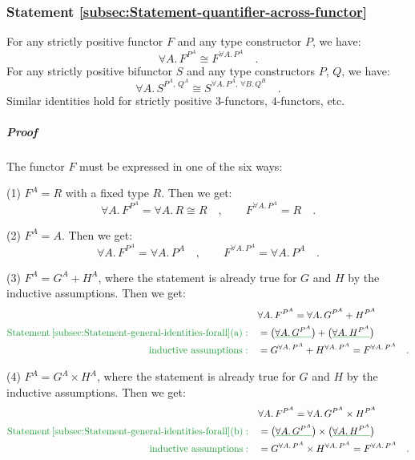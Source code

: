 \subsubsection{Statement \label{subsec:Statement-quantifier-across-functor}\ref{subsec:Statement-quantifier-across-functor}}

For any strictly positive functor $F$ and any type constructor $P$,
we have:
\[
\forall A.\,F^{P^{A}}\cong F^{\forall A.\,P^{A}}\quad.
\]
For any strictly positive bifunctor $S$ and any type constructors
$P$, $Q$, we have:
\[
\forall A.\,S^{P^{A},\,Q^{A}}\cong S^{\forall A.\,P^{A},\,\forall B.\,Q^{B}}\quad.
\]
Similar identities hold for strictly positive $3$-functors, $4$-functors,
etc.

\subparagraph{Proof}

The functor $F$ must be expressed in one of the six ways:

(1) $F^{A}=R$ with a fixed type $R$. Then we get:
\[
\forall A.\,F^{P^{A}}=\forall A.\,R\cong R\quad,\quad\quad F^{\forall A.\,P^{A}}=R\quad.
\]

(2) $F^{A}=A$. Then we get:
\[
\forall A.\,F^{P^{A}}=\forall A.\,P^{A}\quad,\quad\quad F^{\forall A.\,P^{A}}=\forall A.\,P^{A}\quad.
\]

(3) $F^{A}=G^{A}+H^{A}$, where the statement is already true for
$G$ and $H$ by the inductive assumptions. Then we get:
\begin{align*}
 & \forall A.\,F^{P^{A}}=\forall A.\,G^{P^{A}}+H^{P^{A}}\\
{\color{greenunder}\text{Statement\,\ref{subsec:Statement-general-identities-forall}(a)}:}\quad & =\big(\gunderline{\forall A.\,G^{P^{A}}}\big)+\big(\gunderline{\forall A.\,H^{P^{A}}}\big)\\
{\color{greenunder}\text{inductive assumptions}:}\quad & =G^{\forall A.\,P^{A}}+H^{\forall A.\,P^{A}}=F^{\forall A.\,P^{A}}\quad.
\end{align*}

(4) $F^{A}=G^{A}\times H^{A}$, where the statement is already true
for $G$ and $H$ by the inductive assumptions. Then we get:
\begin{align*}
 & \forall A.\,F^{P^{A}}=\forall A.\,G^{P^{A}}\times H^{P^{A}}\\
{\color{greenunder}\text{Statement\,\ref{subsec:Statement-general-identities-forall}(b)}:}\quad & =\big(\gunderline{\forall A.\,G^{P^{A}}}\big)\times\big(\gunderline{\forall A.\,H^{P^{A}}}\big)\\
{\color{greenunder}\text{inductive assumptions}:}\quad & =G^{\forall A.\,P^{A}}\times H^{\forall A.\,P^{A}}=F^{\forall A.\,P^{A}}\quad.
\end{align*}

